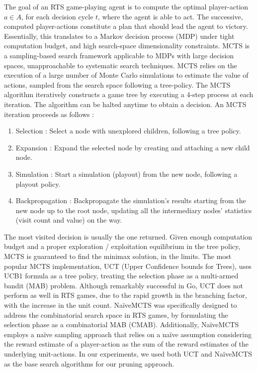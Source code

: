 \documentclass[conference]{IEEEtran}
\begin{document}
The goal of an RTS game-playing agent is to compute the optimal player-action $a \in A$, for each decision cycle $t$, where the agent is able to act. The successive, computed player-actions constitute a plan that should lead the agent to victory. Essentially, this translates to a Markov decision process (MDP) under tight computation budget, and high search-space dimensionality constraints. MCTS is a sampling-based search framework applicable to MDPs with large decision spaces, unapproachable to systematic search techniques. MCTS relies on the execution of a large number of Monte Carlo simulations to estimate the value of actions, sampled from the search space following a tree-policy. The MCTS algorithm iteratively constructs a game tree by executing a 4-step process at each iteration. The algorithm can be halted anytime to obtain a decision. An MCTS iteration proceeds as follows : 

\begin{enumerate}
\item Selection : Select a node with unexplored children, following a tree policy.
\item Expansion : Expand the selected node by creating and attaching a new child node.
\item Simulation : Start a simulation (playout) from the new node, following a playout policy.
\item Backpropagation : Backpropagate the simulation's results starting from the new node up to the root node, updating all the intermediary nodes' statistics (visit count and value) on the way.
\end{enumerate}

The most visited decision is usually the one returned. Given enough computation budget and a proper exploration / exploitation equilibrium in the tree policy, MCTS is guaranteed to find the minimax solution, in the limits. The most popular MCTS implementation, UCT (Upper Confidence bounds for Trees), uses UCB1 formula as a tree policy, treating the selection phase as a multi-armed bandit (MAB) problem. Although remarkably successful in Go, UCT does not perform as well in RTS games, due to the rapid growth in the branching factor, with the increase in the unit count. NaïveMCTS was specifically designed to address the combinatorial search space in RTS games, by formulating the selection phase as a combinatorial MAB (CMAB). Additionally, NaïveMCTS employs a naïve sampling approach that relies on a naïve assumption considering the reward estimate of a player-action as the sum of the reward estimates of the underlying unit-actions. In our experiments, we used both UCT and NaïveMCTS as the base search algorithms for our pruning approach.
\end{document}
